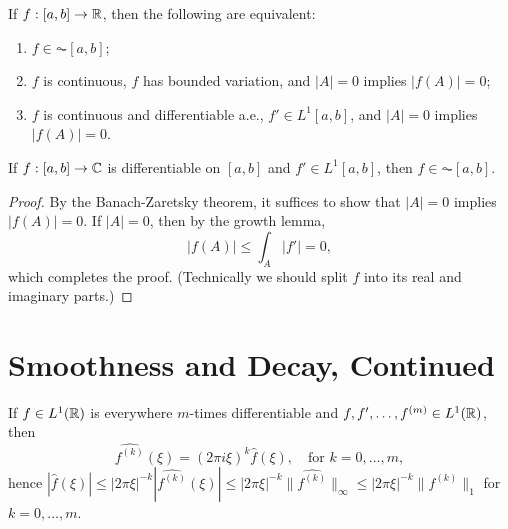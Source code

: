 \begin{theorem}
  If $f : [a, b] \to \mathbb{R}$, then the
  following are equivalent:
  \begin{enumerate}
    \item $f \in \AC[a, b]$;
    \item $f$ is continuous, $f$ has
      bounded variation, and
      $|A| = 0$ implies $|f(A)| = 0$;
    \item $f$ is continuous and
      differentiable a.e.,
      $f' \in L^1[a, b]$, and
      $|A| = 0$ implies $|f(A)| = 0$.
  \end{enumerate}
\end{theorem}

\begin{theorem}\label{thm:abs-cont-sufficient}
  If $f : [a, b] \to \mathbb{C}$ is differentiable
  on $[a, b]$ and $f' \in L^1[a, b]$,
  then $f \in \AC[a, b]$.
\end{theorem}

\begin{proof}
  By the Banach-Zaretsky theorem, it
  suffices to show that $|A| = 0$ implies
  $|f(A)| = 0$. If $|A| = 0$, then by the
  growth lemma,
  \[
    |f(A)| \le \int_A |f'| = 0,
  \]
  which completes the proof. (Technically
  we should split $f$ into its real and
  imaginary parts.)
\end{proof}

\section{Smoothness and Decay, Continued}

\begin{theorem}
  If $f \in L^1(\mathbb{R})$ is everywhere
  $m$-times differentiable
  and $f, f', \dots, f^{(m)} \in L^1(\mathbb{R})$,
  then
  \[
    \widehat{f^{(k)}}(\xi)
    = (2\pi i \xi)^k \widehat{f}(\xi),
    \quad \text{for } k = 0, \dots, m,
  \]
  hence $|\widehat{f}(\xi)| \le |2\pi \xi|^{-k} |\widehat{f^{(k)}}(\xi)| \le |2\pi \xi|^{-k} \|\widehat{f^{(k)}}\|_\infty \le |2\pi \xi|^{-k} \|f^{(k)}\|_1$
  for $k = 0, \dots, m$.
\end{theorem}

